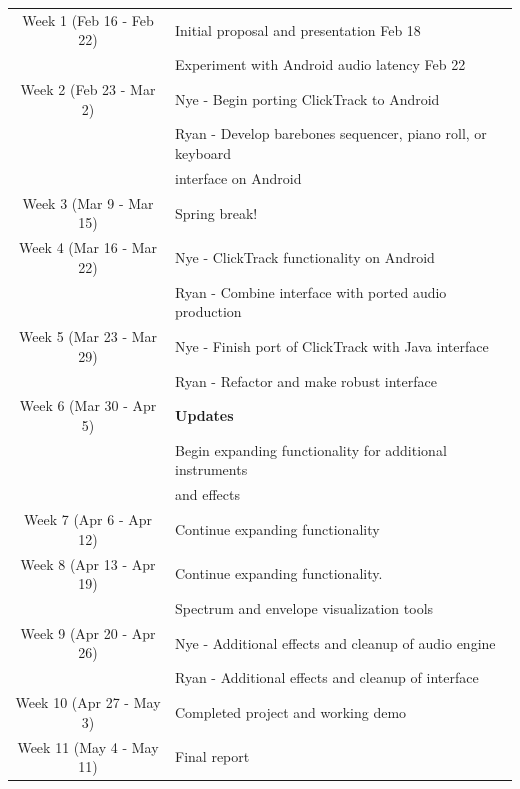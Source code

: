 \documentclass[letterpaper,12pt]{article}
\begin{document}
\begin{tabular}{| c || l |}
  \hline 
  Week 1 (Feb 16 - Feb 22) & Initial proposal and presentation Feb 18 \\ 
                           & Experiment with Android audio latency Feb 22 \\ \hline
  Week 2 (Feb 23 - Mar 2)  & Nye - Begin porting ClickTrack to Android \\
                           & Ryan -  Develop barebones sequencer, piano roll, or keyboard \\ &interface on Android \\ \hline
  Week 3 (Mar 9 - Mar 15)  & Spring break!  \\ \hline
  Week 4 (Mar 16 - Mar 22) & Nye - ClickTrack functionality on Android \\ 
                           & Ryan - Combine interface with ported audio production \\ \hline
  Week 5 (Mar 23 - Mar 29) & Nye - Finish port of ClickTrack with Java interface \\
                           & Ryan - Refactor and make robust interface \\ \hline
  Week 6 (Mar 30 - Apr 5)  & \textbf{Updates} \\
                           & Begin expanding functionality for additional instruments \\ & and effects\\ \hline
  Week 7 (Apr 6 - Apr 12)  &  Continue expanding functionality \\ \hline
  Week 8 (Apr 13 - Apr 19) & Continue expanding functionality. \\
                           & Spectrum and envelope visualization tools \\ \hline
  Week 9 (Apr 20 - Apr 26) & Nye - Additional effects and cleanup of audio engine \\
                           & Ryan - Additional effects and cleanup of interface \\ \hline
  Week 10 (Apr 27 - May 3) & Completed project and working demo  \\ \hline
  Week 11 (May 4 - May 11) & Final report  \\ \hline
\end{tabular}
\end{document}
